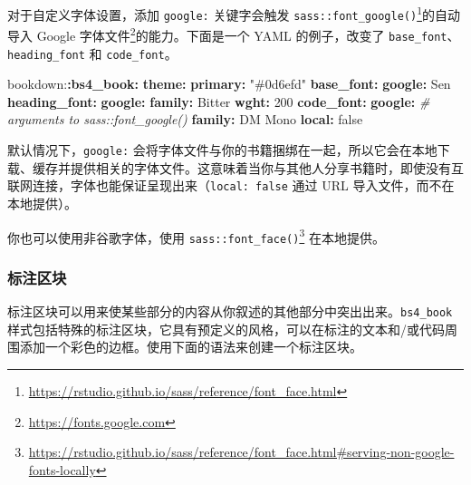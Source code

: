 \documentclass[
  12pt,
]{krantz}
\newenvironment{Shaded}{\begin{snugshade}}{\end{snugshade}}
\newcommand{\AttributeTok}[1]{\textcolor[rgb]{0.13,0.29,0.53}{#1}}
\newcommand{\CharTok}[1]{\textcolor[rgb]{0.31,0.60,0.02}{#1}}
\newcommand{\CommentTok}[1]{\textcolor[rgb]{0.56,0.35,0.01}{\textit{#1}}}
\newcommand{\DecValTok}[1]{\textcolor[rgb]{0.00,0.00,0.81}{#1}}
\newcommand{\FunctionTok}[1]{\textcolor[rgb]{0.13,0.29,0.53}{\textbf{#1}}}
\newcommand{\KeywordTok}[1]{\textcolor[rgb]{0.13,0.29,0.53}{\textbf{#1}}}
\newcommand{\StringTok}[1]{\textcolor[rgb]{0.31,0.60,0.02}{#1}}
\renewcommand{\href}[2]{#2\footnote{\url{#1}}}
\theoremstyle{definition}
\theoremstyle{definition}
\theoremstyle{definition}
\theoremstyle{definition}
\theoremstyle{remark}
\begin{document}
对于自定义字体设置，添加 \texttt{google:} 关键字会触发 \href{https://rstudio.github.io/sass/reference/font_face.html}{\texttt{sass::font\_google()}}的自动导入 \href{https://fonts.google.com}{Google 字体文件}的能力。下面是一个 YAML 的例子，改变了 \texttt{base\_font}、\texttt{heading\_font} 和 \texttt{code\_font}。

\begin{Shaded}
\begin{Highlighting}[]
\AttributeTok{bookdown:}\FunctionTok{:bs4\_book}\KeywordTok{:}
\AttributeTok{  }\FunctionTok{theme}\KeywordTok{:}
\AttributeTok{    }\FunctionTok{primary}\KeywordTok{:}\AttributeTok{ }\StringTok{"\#0d6efd"}\AttributeTok{   }
\AttributeTok{    }\FunctionTok{base\_font}\KeywordTok{:}\AttributeTok{ }
\AttributeTok{      }\FunctionTok{google}\KeywordTok{:}\AttributeTok{ Sen}
\AttributeTok{    }\FunctionTok{heading\_font}\KeywordTok{:}
\AttributeTok{      }\FunctionTok{google}\KeywordTok{:}
\AttributeTok{        }\FunctionTok{family}\KeywordTok{:}\AttributeTok{ Bitter}
\AttributeTok{        }\FunctionTok{wght}\KeywordTok{:}\AttributeTok{ }\DecValTok{200}
\AttributeTok{    }\FunctionTok{code\_font}\KeywordTok{:}
\AttributeTok{      }\FunctionTok{google}\KeywordTok{:}\AttributeTok{ }
\CommentTok{        \# arguments to sass::font\_google() }
\AttributeTok{        }\FunctionTok{family}\KeywordTok{:}\AttributeTok{ DM Mono}
\AttributeTok{        }\FunctionTok{local}\KeywordTok{:}\AttributeTok{ }\CharTok{false}
\end{Highlighting}
\end{Shaded}

默认情况下，\texttt{google:} 会将字体文件与你的书籍捆绑在一起，所以它会在本地下载、缓存并提供相关的字体文件。这意味着当你与其他人分享书籍时，即使没有互联网连接，字体也能保证呈现出来（\texttt{local:\ false} 通过 URL 导入文件，而不在本地提供）。

你也可以使用非谷歌字体，使用 \href{https://rstudio.github.io/sass/reference/font_face.html\#serving-non-google-fonts-locally}{\texttt{sass::font\_face()}} 在本地提供。

\hypertarget{ux6807ux6ce8ux533aux5757}{%
\subsubsection{标注区块}\label{ux6807ux6ce8ux533aux5757}}

标注区块可以用来使某些部分的内容从你叙述的其他部分中突出出来。\texttt{bs4\_book} 样式包括特殊的标注区块，它具有预定义的风格，可以在标注的文本和/或代码周围添加一个彩色的边框。使用下面的语法来创建一个标注区块。
\end{document}
